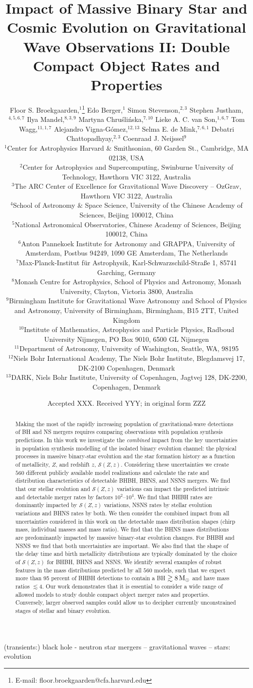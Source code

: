 \documentclass[fleqn,usenatbib]{mnras}
\title[Gravitational Wave Rates and Distribution Shapes]{Impact of Massive Binary Star and Cosmic Evolution on Gravitational Wave Observations II: Double Compact Object Rates and Properties}
\author[Broekgaarden et al.]{{Floor S. Broekgaarden},$^{1}$\thanks{E-mail: floor.broekgaarden@cfa.harvard.edu}
{Edo Berger},$^{1}$
Simon Stevenson,$^{2,3}$
{Stephen Justham},$^{4,5,6,7}$
{Ilya Mandel},$^{8,3,9}$
\newauthor
{Martyna Chru{\'s}li{\'n}ska},$^{7,10}$
Lieke A. C. van Son,$^{1,6,7}$
Tom Wagg,$^{11,1,7}$ 
{Alejandro Vigna-G\'{o}mez},$^{12,13}$
\newauthor
{Selma E. de Mink},$^{7,6,1}$
Debatri Chattopadhyay,$^{2,3}$
{Coenraad J. Neijssel}$^{9}$
\\
$^{1}${Center for Astrophysics \textbar{} Harvard $\&$ Smithsonian,
60 Garden St., Cambridge, MA 02138, USA}\\
$^{2}${Center for Astrophysics and Supercomputing, Swinburne University of Technology, Hawthorn VIC 3122, Australia}\\
$^{3}${The ARC Center of Excellence for Gravitational Wave Discovery -- OzGrav, Hawthorn VIC 3122, Australia}\\
$^{4}${School of Astronomy $\&$ Space Science, University of the Chinese Academy of Sciences, Beijing 100012, China}\\
$^{5}${National Astronomical Observatories, Chinese Academy of Sciences, Beijing 100012, China} \\
$^{6}${Anton Pannekoek Institute for Astronomy and GRAPPA, University of Amsterdam, Postbus 94249, 1090 GE Amsterdam, The Netherlands }\\
$^{7}${Max-Planck-Institut f\"{u}r Astrophysik, Karl-Schwarzschild-Stra{\ss}e 1, 85741 Garching, Germany} \\
$^{8}${Monash Centre for Astrophysics, School of Physics and Astronomy, Monash University, Clayton, Victoria 3800, Australia}\\
$^{9}${Birmingham Institute for Gravitational Wave Astronomy and School of Physics and Astronomy, University of Birmingham, Birmingham, B15 2TT, United Kingdom}\\
$^{10}${Institute of Mathematics, Astrophysics and Particle Physics, Radboud University Nijmegen, PO Box 9010, 6500 GL Nijmegen}\\
$^{11}${Department of Astronomy, University of Washington, Seattle, WA, 98195}\\
$^{12}${Niels Bohr International Academy, The Niels Bohr Institute, Blegdamsvej 17, DK-2100 Copenhagen, Denmark}\\
$^{13}${DARK, Niels Bohr Institute, University of Copenhagen, Jagtvej 128, DK-2200, Copenhagen, Denmark}}
\date{Accepted XXX. Received YYY; in original form ZZZ}
\newcommand{\Msun}{\ensuremath{\,\rm{M}_{\odot}}\xspace}
\newcommand{\SFRD}{\ensuremath{\mathcal{S}(Z,z)}\xspace}
\newcommand{\Nmodels}{\ensuremath{560}\xspace}
\begin{document}
\label{firstpage}
\pagerange{\pageref{firstpage}--\pageref{lastpage}}
\maketitle

\begin{abstract}
%
Making the most of the rapidly increasing population of gravitational-wave detections of \ac{BH} and \ac{NS} mergers requires comparing observations with population synthesis predictions.  In this work we investigate the \textit{combined} impact from the key uncertainties in population synthesis modelling of the isolated binary evolution channel: the physical processes in massive binary-star evolution and the star formation history as a function of metallicity, $Z$, and redshift $z$, \SFRD. Considering these uncertainties we create \Nmodels different publicly available model realizations and calculate the rate and distribution characteristics of detectable BHBH, BHNS, and NSNS mergers. 
%
We find that our stellar evolution and \SFRD variations can impact the predicted intrinsic and detectable merger rates by factors $10^2$--$10^4$. We find that {BHBH} rates are dominantly impacted by \SFRD variations, {NSNS} rates by stellar evolution variations and {BHNS} rates by both.
%
We then consider the combined impact from all uncertainties considered in this work on the detectable mass {distribution shapes}  (chirp mass, individual masses and mass ratio). We find that the {BHNS} mass distributions are predominantly impacted by massive binary-star evolution changes. For {BHBH} and {NSNS} we find that both uncertainties are important. 
%
We also find that the shape of the delay time and birth metallicity distributions are typically dominated by the choice of \SFRD for BHBH, BHNS and NSNS. 
We identify several examples of robust features in the mass distributions predicted by all \Nmodels models, such that we expect more than 95 percent of {BHBH} detections to contain a \ac{BH} $\gtrsim 8\Msun$ and have mass ratios $ \lesssim 4$.  
%
Our work demonstrates that it is essential to consider a wide range of allowed models to study double compact object merger rates and properties.  Conversely, larger observed samples could allow us to decipher currently unconstrained stages of stellar and binary evolution.

% 
%
\end{abstract}

\begin{keywords}
 (transients:) black hole - neutron star mergers -- gravitational waves -- stars: evolution
\end{keywords}
\end{document}
